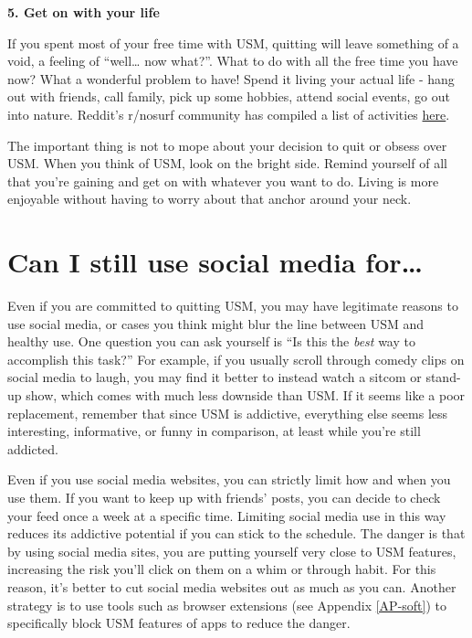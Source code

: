 \documentclass[
  openany]{book}
\begin{document}
\textbf{5. Get on with your life}

If you spent most of your free time with USM, quitting will leave something of a void, a feeling of ``well\ldots{} now what?''. What to do with all the free time you have now? What a wonderful problem to have! Spend it living your actual life - hang out with friends, call family, pick up some hobbies, attend social events, go out into nature. Reddit's r/nosurf community has compiled a list of activities \href{https://www.reddit.com/r/nosurf/wiki/activities/}{here}.

The important thing is not to mope about your decision to quit or obsess over USM. When you think of USM, look on the bright side. Remind yourself of all that you're gaining and get on with whatever you want to do. Living is more enjoyable without having to worry about that anchor around your neck.

\section{Can I still use social media for\ldots{}}\label{can-i-still-use-social-media-for}

Even if you are committed to quitting USM, you may have legitimate reasons to use social media, or cases you think might blur the line between USM and healthy use. One question you can ask yourself is ``Is this the \emph{best} way to accomplish this task?'' For example, if you usually scroll through comedy clips on social media to laugh, you may find it better to instead watch a sitcom or stand-up show, which comes with much less downside than USM. If it seems like a poor replacement, remember that since USM is addictive, everything else seems less interesting, informative, or funny in comparison, at least while you're still addicted.

Even if you use social media websites, you can strictly limit how and when you use them. If you want to keep up with friends' posts, you can decide to check your feed once a week at a specific time. Limiting social media use in this way reduces its addictive potential if you can stick to the schedule. The danger is that by using social media sites, you are putting yourself very close to USM features, increasing the risk you'll click on them on a whim or through habit. For this reason, it's better to cut social media websites out as much as you can. Another strategy is to use tools such as browser extensions (see Appendix \ref{AP-soft}) to specifically block USM features of apps to reduce the danger.
\end{document}
